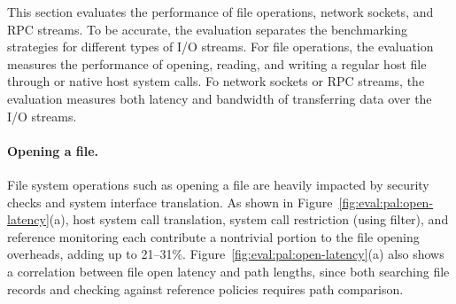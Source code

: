 \label{sec:eval:pal:stream}

This section
evaluates the performance of
file operations, network sockets, and RPC streams.
To be accurate,
the evaluation separates the benchmarking strategies
for different types of I/O streams.
For file operations,
the evaluation
measures the performance of opening, reading, and writing a regular host file through \hostapis{} or native host system calls.
Fo network sockets or RPC streams,
the evaluation measures 
both latency and bandwidth of transferring data over the I/O streams.







\paragraph{Opening a file.}
File system operations such as opening a file
are heavily impacted
by security checks and system interface translation.
As shown in Figure~\ref{fig:eval:pal:open-latency}(a),
host system call translation, system call restriction (using \seccomp{} filter), and reference monitoring
each contribute a nontrivial portion to the file opening overheads,
adding up to 21--31\%.
Figure~\ref{fig:eval:pal:open-latency}(a)
also shows a correlation
between file open latency and path lengths,
since both searching file records and checking against reference policies
requires path comparison.



